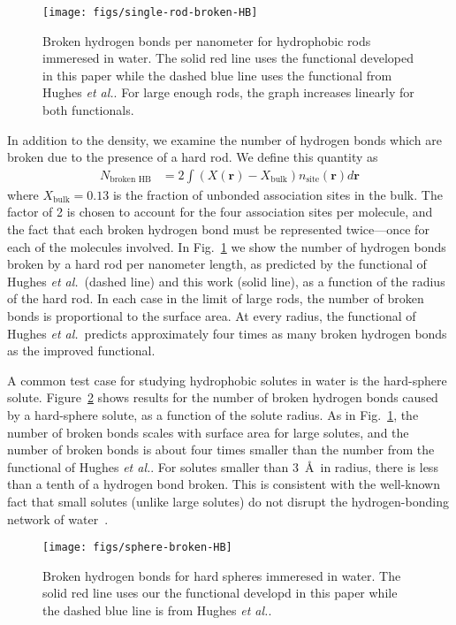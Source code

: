 \documentclass[twocolumn,amsmath,amssymb]{revtex4-1}
\newcommand{\rr}{\textbf{r}}
\newcommand\hughesetal{Hughes \emph{et al.}}
\begin{document}
\begin{figure}
\begin{center}
\texttt{[image: figs/single-rod-broken-HB]}
\end{center}
\caption{Broken hydrogen bonds per nanometer for hydrophobic rods
  immeresed in water.  The solid red line uses the functional developed
  in this paper while the dashed blue line uses the functional from
  \hughesetal. For large enough rods, the graph
  increases linearly for both functionals.}
\label{fig:single-rod-broken-HB}
\end{figure}

In addition to the density, we examine the number of hydrogen bonds
which are broken due to the presence of a hard rod.  We define this
quantity as
\begin{align}
  N_{\text{broken HB}} &= 2 \int (X(\rr) - X_{\text{bulk}})n_{\text{site}}(\rr) d\rr
\end{align}
where $X_{\text{bulk}} = 0.13$ is the fraction of unbonded
association sites in the bulk.  The factor of 2 is chosen to account
for the four association sites per molecule, and the fact that each
broken hydrogen bond must be represented twice---once for each of the
molecules involved.  In Fig.~\ref{fig:single-rod-broken-HB} we show
the number of hydrogen bonds broken by a hard rod per nanometer
length, as predicted by the functional of \hughesetal\ (dashed line)
and this work (solid line), as a function of the radius of the hard
rod.  In each case in the limit of large rods, the number of broken
bonds is proportional to the surface area.  At every radius, the
functional of \hughesetal\ predicts approximately four times as many
broken hydrogen bonds as the improved functional.

A common test case for studying hydrophobic solutes in water is the
hard-sphere solute.  Figure~\ref{fig:spheres-broken-HB} shows results
for the number of broken hydrogen bonds caused by a hard-sphere solute,
as a function of the solute radius.  As in
Fig.~\ref{fig:single-rod-broken-HB}, the number of broken bonds scales
with surface area for large solutes, and the number of broken bonds is
about four times smaller than the number from the functional of
\hughesetal.  For solutes smaller than
3~\AA\ in radius, there is less than a tenth of a hydrogen bond
broken. This is consistent with the well-known fact that small solutes
(unlike large solutes) do not disrupt the hydrogen-bonding network of
water~\cite{chandler2005}.

\begin{figure}
\begin{center}
\texttt{[image: figs/sphere-broken-HB]}
\end{center}
\caption{Broken hydrogen bonds for hard spheres immeresed in water.
  The solid red line uses our the functional developd in this paper
  while the dashed blue line is from
  \hughesetal.}
\label{fig:spheres-broken-HB}
\end{figure}
\end{document}
